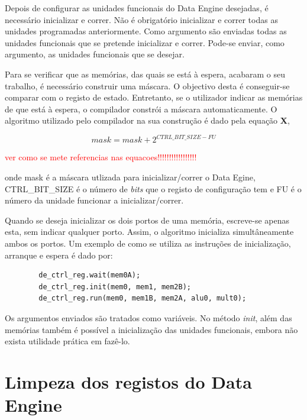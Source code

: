 

Depois de configurar as unidades funcionais do Data Engine desejadas, é necessário inicializar e correr. 
Não é obrigatório inicializar e correr todas as unidades programadas anteriormente.
Como argumento são enviadas todas as unidades funcionais que se pretende inicializar e correr. 
Pode-se enviar, como argumento, as unidades funcionais que se desejar.

Para se verificar que as memórias, das quais se está à espera, acabaram o seu trabalho, é necessário construir uma máscara. O objectivo desta é conseguir-se comparar com o registo de estado. 
Entretanto, se o utilizador indicar as memórias de que está à espera, o compilador constrói a máscara automaticamente.
O algoritmo utilizado pelo compilador na sua construção é dado pela equação {\bf X},

\begin{equation}\label{eqn:aaa}
mask = mask + 2^{CTRL\_BIT\_SIZE-FU} 
\end{equation}

\textcolor{red}{ver como se mete referencias nas equacoes!!!!!!!!!!!!!!!!!}

onde mask é a máscara utlizada para inicializar/correr o Data Egine, CTRL\_BIT\_SIZE é o número de {\it bits} que o registo de
configuração tem e FU é o número da unidade funcionar a inicializar/correr.

Quando se deseja inicializar os dois portos de uma memória, escreve-se apenas esta, sem indicar qualquer porto. Assim, o algoritmo inicializa simultâneamente ambos os portos.
Um exemplo de como se utiliza as instruções de inicialização, arranque e espera é dado por:

\begin{lstlisting}
		de_ctrl_reg.wait(mem0A);
		de_ctrl_reg.init(mem0, mem1, mem2B);
		de_ctrl_reg.run(mem0, mem1B, mem2A, alu0, mult0); 
\end{lstlisting}

Os argumentos enviados são tratados como variáveis. No método {\it init}, além das memórias também é possível a inicialização das unidades funcionais, 
embora não exista utilidade prática em fazê-lo. 


\section{Limpeza dos registos do Data Engine}
\label{section:clear flag}

